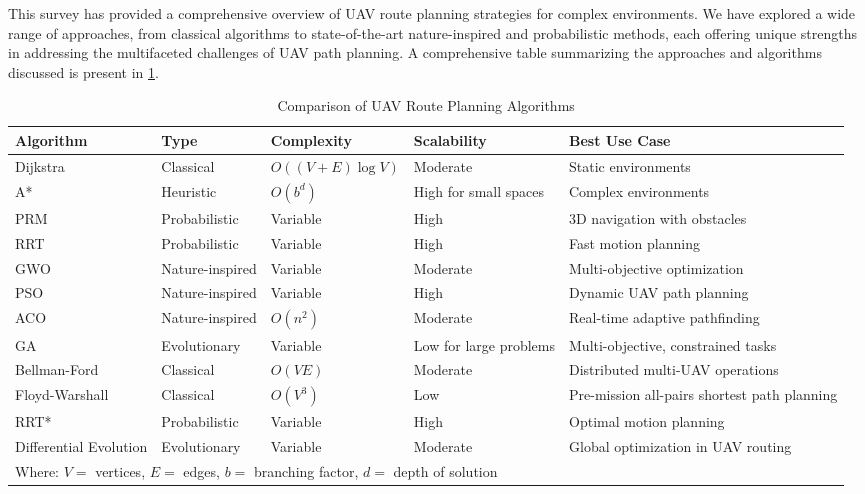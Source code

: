 \documentclass[conference]{IEEEtran}
\begin{document}
This survey has provided a comprehensive overview of UAV route planning strategies for complex environments. We have explored a wide range of approaches, from classical algorithms to state-of-the-art nature-inspired and probabilistic methods, each offering unique strengths in addressing the multifaceted challenges of UAV path planning. A comprehensive table summarizing the approaches and algorithms discussed is present in \ref{tab:uav_comparison}.

\begin{table}[ht]
\centering
\caption{Comparison of UAV Route Planning Algorithms}
\label{tab:uav_comparison}
\renewcommand{\arraystretch}{1.2}
\small
\begin{tabular}{|p{1.5cm}|p{1.5cm}|p{1.4cm}|p{1.7cm}|p{2.3cm}|}
\hline
\textbf{Algorithm} & \textbf{Type} & \textbf{Complexity} & \textbf{Scalability} & \textbf{Best Use Case} \\
\hline
Dijkstra & Classical & $O((V+E)\log V)$ & Moderate & Static environments \\
\hline
A* & Heuristic & $O(b^d)$ & High for small spaces & Complex environments \\
\hline
PRM & Probabilistic & Variable & High & 3D navigation with obstacles \\
\hline
RRT & Probabilistic & Variable & High & Fast motion planning \\
\hline
GWO & Nature-inspired & Variable & Moderate & Multi-objective optimization \\
\hline
PSO & Nature-inspired & Variable & High & Dynamic UAV path planning \\
\hline
ACO & Nature-inspired & $O(n^2)$ & Moderate & Real-time adaptive pathfinding \\
\hline
GA & Evolutionary & Variable & Low for large problems & Multi-objective, constrained tasks \\
\hline
Bellman-Ford & Classical & $O(VE)$ & Moderate & Distributed multi-UAV operations \\
\hline
Floyd-Warshall & Classical & $O(V^3)$ & Low & Pre-mission all-pairs shortest path planning \\
\hline
RRT* & Probabilistic & Variable & High & Optimal motion planning \\
\hline
Differential Evolution & Evolutionary & Variable & Moderate & Global optimization in UAV routing \\
\hline
\multicolumn{5}{l}{\small Where: $V =$ vertices, $E =$ edges, $b =$ branching factor, $d =$ depth of solution}\\
\end{tabular}
\end{table}
\end{document}
